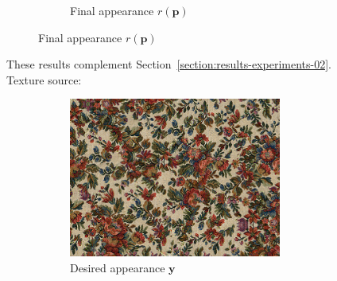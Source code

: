 \begin{figure}[]
\begin{subfigure}{\textwidth}
\begin{subfigure}{0.78\textwidth}
\begin{subfigure}{0.32\textwidth}
            \end{subfigure}
            \caption*{Final appearance \(r(\bm{p})\)}
        \end{subfigure}
    \end{subfigure}
    \caption{These results complement Section~\ref{section:results-experiments-02}. Texture source: \citet{Pixar128}}
    \label{fig:ex02-complete-sofa-marble_wood_pebbles}
\end{figure}

\begin{figure}[]
    \centering    
    \begin{subfigure}{\textwidth}
        \centering
        \begin{subfigure}{0.2\textwidth}
            \centering
            \includegraphics[width=\textwidth]{images/04-experiment02/sofa/flowers/target.jpg}
            \caption*{Desired appearance \(\bm{y}\)}
        \end{subfigure}
        \hfill
        \begin{subfigure}{0.78\textwidth}
            \centering
            \begin{subfigure}{0.32\textwidth}
                \centering
                \begin{tikzpicture}

\end{tikzpicture}
\end{subfigure}
\end{subfigure}
\end{subfigure}
\end{figure}
